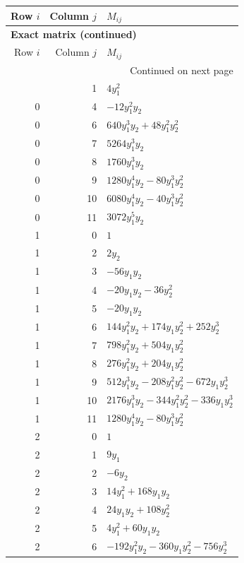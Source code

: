 \documentclass[10pt,a4paper]{article}
\begin{document}
{\small\setlength{\tabcolsep}{7pt}\begin{longtable}{rrp{125mm}}
\toprule Row $i$ & Column $j$ & $M_{ij}$\\\midrule\endfirsthead
\multicolumn{3}{l}{\textbf{Exact matrix (continued)}}\\
\toprule Row $i$ & Column $j$ & $M_{ij}$\\\midrule\endhead
\midrule\multicolumn{3}{r}{Continued on next page}\\\endfoot\bottomrule\endlastfoot
0 & 1 & $4 y_{1}^{2}$\\
0 & 4 & $- 12 y_{1}^{2} y_{2}$\\
0 & 6 & $640 y_{1}^{3} y_{2} + 48 y_{1}^{2} y_{2}^{2}$\\
0 & 7 & $5264 y_{1}^{3} y_{2}$\\
0 & 8 & $1760 y_{1}^{3} y_{2}$\\
0 & 9 & $1280 y_{1}^{4} y_{2} - 80 y_{1}^{3} y_{2}^{2}$\\
0 & 10 & $6080 y_{1}^{4} y_{2} - 40 y_{1}^{3} y_{2}^{2}$\\
0 & 11 & $3072 y_{1}^{5} y_{2}$\\
1 & 0 & $1$\\
1 & 2 & $2 y_{2}$\\
1 & 3 & $- 56 y_{1} y_{2}$\\
1 & 4 & $- 20 y_{1} y_{2} - 36 y_{2}^{2}$\\
1 & 5 & $- 20 y_{1} y_{2}$\\
1 & 6 & $144 y_{1}^{2} y_{2} + 174 y_{1} y_{2}^{2} + 252 y_{2}^{3}$\\
1 & 7 & $798 y_{1}^{2} y_{2} + 504 y_{1} y_{2}^{2}$\\
1 & 8 & $276 y_{1}^{2} y_{2} + 204 y_{1} y_{2}^{2}$\\
1 & 9 & $512 y_{1}^{3} y_{2} - 208 y_{1}^{2} y_{2}^{2} - 672 y_{1} y_{2}^{3}$\\
1 & 10 & $2176 y_{1}^{3} y_{2} - 344 y_{1}^{2} y_{2}^{2} - 336 y_{1} y_{2}^{3}$\\
1 & 11 & $1280 y_{1}^{4} y_{2} - 80 y_{1}^{3} y_{2}^{2}$\\
2 & 0 & $1$\\
2 & 1 & $9 y_{1}$\\
2 & 2 & $- 6 y_{2}$\\
2 & 3 & $14 y_{1}^{2} + 168 y_{1} y_{2}$\\
2 & 4 & $24 y_{1} y_{2} + 108 y_{2}^{2}$\\
2 & 5 & $4 y_{1}^{2} + 60 y_{1} y_{2}$\\
2 & 6 & $- 192 y_{1}^{2} y_{2} - 360 y_{1} y_{2}^{2} - 756 y_{2}^{3}$\\

\end{longtable}}
\end{document}
